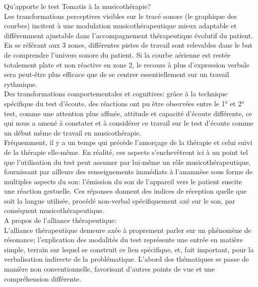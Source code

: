 \begin{itemize}
  Qu'apporte le test Tomatis à la musicothérapie?
   \\
 Les transformations perceptives visibles sur
 le tracé sonore (le graphique des courbes) incitent à une modulation
 musicothérapeutique mieux adaptable et différemment ajustable  dans l'accompagnement 
 thérapeutique évolutif du patient.
 En se référant aux
 3 zones,  différentes pistes de travail sont relevables dans le but de
 comprendre l'univers sonore du patient. 
 Si la courbe aérienne est restée
 totalement plate et non
 réactive en zone 2, le recours à plus d'expression verbale sera peut-être plus efficace que de se 
 centrer essentiellement sur un travail rythmique.  
    \\
 Des transformations comportementales et cognitives: grâce à la technique spécifique du test d'écoute, 
 des réactions ont pu être observées entre le 1° et 2° 
 test, comme une attention plus affinée, attitude et capacité d'écoute différente, ce qui nous 
 a amené à constater et à considérer ce travail sur le test d'écoute comme un début même de  travail en 
 musicothérapie. 
   \\
  Fréquemment, il y a un temps qui
  précède
  l'amorçage de la thérapie et celui suivi de la thérapie elle-même.
  En réalité, ces aspects s'enchevêtrent ici à un point tel que
  l'utilisation du test peut assumer par lui-même un rôle musicothérapeutique, fournissant par ailleurs des
  renseignements immédiats à l'anamnèse sous forme de multiples
  aspects du son: l'émission du son de
  l'appareil vers le patient suscite une  réaction gestuelle.  Ces réponses  
  donnent des indices de réception %
  quelle que soit la langue utilisée, procédé non-verbal
  spécifiquement axé sur le son, par conséquent  musicothérapeutique. 
  	  \\
  	 A propos de l'alliance thérapeutique: 
  	 	  \\
  	 L'alliance thérapeutique demeure axée à proprement parler sur
  	un phénomène de résonance;  l'explication des modalités du test représente une
  	entrée en matière simple, terrain sur lequel se construit ce lien spécifique,
  	et, fait important, pour la verbalisation indirecte de la problématique. L'abord des thématiques se passe 
  	de manière non conventionnelle, favorisant d'autres points de vue et une compréhension différente.

\end{itemize}
